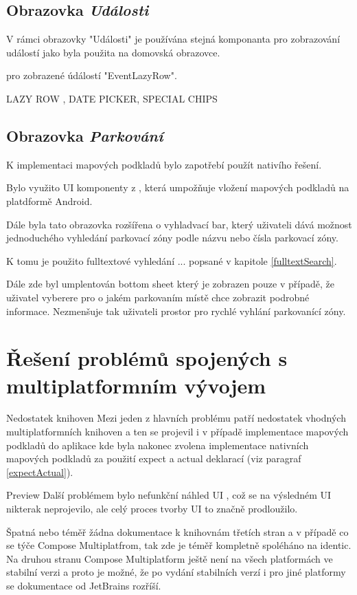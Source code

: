 \subsection{Obrazovka \textit{Události}}

V rámci obrazovky "Události" je používána stejná komponanta pro zobrazování událostí jako byla použita na domovská obrazovce. 

pro zobrazené údálostí "EventLazyRow". 

LAZY ROW , DATE PICKER, SPECIAL CHIPS


\subsection{Obrazovka \textit{Parkování}} \label{parkingScreenImpl}
K implementaci mapových podkladů bylo zapotřebí použít nativího řešení. 


Bylo využito UI komponenty  z , která umpožňuje vložení mapových podkladů 
na platdformě Android.

Dále byla tato obrazovka rozšířena o vyhladvací bar, který uživateli dává možnost jednoduchého vyhledání parkovací zóny podle názvu nebo čísla 
parkovací zóny.

K tomu je použito fulltextové vyhledání ... popsané v kapitole \ref{fulltextSearch}. 


Dále zde byl umplentován bottom sheet který je zobrazen pouze v případě, že uživatel vyberere pro o jakém parkovaním místě chce zobrazit
podrobné informace. Nezmenšuje tak uživateli prostor pro rychlé vyhlání parkovanící zóny.



\section{Řešení problémů spojených s multiplatformním vývojem}
Nedostatek knihoven
Mezi jeden z hlavních problému patří nedostatek vhodných multiplatformních knihoven a ten se projevil i v případě implementace mapových podkladů
do aplikace kde byla nakonec zvolena implementace nativních mapových podkladů za použití expect a actual deklarací (viz paragraf \ref{expectActual}).

Preview
Další problémem bylo nefunkční náhled UI , což se na výsledném UI nikterak neprojevilo, ale celý proces tvorby UI to značně prodloužilo.

Špatná nebo téměř žádna dokumentace k knihovnám třetích stran a v případě co se týče Compose Multiplatfrom, tak zde je téměř kompletně spoléháno na
identic. 
Na druhou stranu Compose Multiplatform ještě není na všech platformách ve stabilní verzi a proto je možné, že po vydání stabilních verzí i pro jiné
platformy se dokumentace od JetBrains rozříší.


